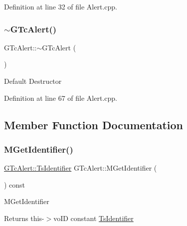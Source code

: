 Definition at line 32 of file Alert.\+cpp.

\mbox{\label{class_g_n_common_1_1_g_tc_alert_ad222cd054ec90b1aa8bf6e58e09d608b}} 
\subsubsection{\texorpdfstring{$\sim$\+G\+Tc\+Alert()}{~GTcAlert()}}
{\footnotesize\ttfamily G\+Tc\+Alert\+::$\sim$\+G\+Tc\+Alert (\begin{DoxyParamCaption}\item[{void}]{ }\end{DoxyParamCaption})}

Default Destructor 

Definition at line 67 of file Alert.\+cpp.



\subsection{Member Function Documentation}
\mbox{\label{class_g_n_common_1_1_g_tc_alert_a0baa69459d87c780b3bad22883f29dec}} 
\subsubsection{\texorpdfstring{M\+Get\+Identifier()}{MGetIdentifier()}}
{\footnotesize\ttfamily \mbox{\hyperlink{struct_g_n_common_1_1_g_tc_alert_1_1_ts_identifier}{G\+Tc\+Alert\+::\+Ts\+Identifier}} G\+Tc\+Alert\+::\+M\+Get\+Identifier (\begin{DoxyParamCaption}\item[{void}]{ }\end{DoxyParamCaption}) const}

M\+Get\+Identifier \begin{DoxyReturn}{Returns}
this-\/$>$vo\+ID constant \mbox{\hyperlink{struct_g_n_common_1_1_g_tc_alert_1_1_ts_identifier}{Ts\+Identifier}} 
\end{DoxyReturn}


